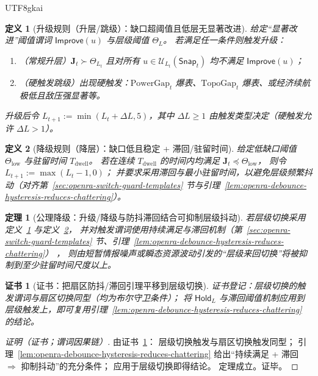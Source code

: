\documentclass[12pt]{article}
\newtheorem{definition}{定义}[section]
\newtheorem{theorem}{定理}[section]
\newtheorem{Certificate}{证书}[section]
\begin{document}
\begin{CJK*}{UTF8}{gkai}
\begin{definition}[升级规则（升层/跳级）：缺口超阈值且低层无显著改进]
\label{def:openra-level-upgrade-rule}
给定“显著改进”阈值谓词 $\mathsf{Improve}(u)$ 与层级阈值 $\Theta_L$。
若满足任一条件则触发升级：
\begin{enumerate}
  \item （常规升层）$\mathbf{J}_t \succ \Theta_{L_t}$ 且对所有 $u\in\mathcal{U}_{L_t}(\mathsf{Snap}_t)$ 均不满足 $\mathsf{Improve}(u)$；

  \item （硬触发跳级）出现硬触发：$\mathrm{PowerGap}_t$ 爆表、$\mathrm{TopoGap}_t$ 爆表、或经济续航极低且敌压强显著等。
\end{enumerate}
升级后令 $L_{t+1}:=\min(L_t+\Delta L,5)$，其中 $\Delta L\ge 1$ 由触发类型决定（硬触发允许 $\Delta L>1$）。
\end{definition}

\begin{definition}[降级规则（降层）：缺口低且稳定 + 滞回/驻留时间]
\label{def:openra-level-downgrade-rule}
给定低缺口阈值 $\Theta_{\mathrm{low}}$ 与驻留时间 $T_{\mathrm{dwell}}$。
若在连续 $T_{\mathrm{dwell}}$ 的时间内均满足 $\mathbf{J}_t \preceq \Theta_{\mathrm{low}}$，
则令 $L_{t+1}:=\max(L_t-1,0)$；
并要求采用滞回与最小驻留时间，以避免层级频繁抖动（对齐第~\ref{sec:openra-switch-guard-templates} 节与引理~\ref{lem:openra-debounce-hysteresis-reduces-chattering}）。
\end{definition}

\begin{theorem}[公理降级：升级/降级与防抖滞回结合可抑制层级抖动]
\label{thm:openra-level-switch-stability}
若层级切换采用定义~\ref{def:openra-level-upgrade-rule} 与定义~\ref{def:openra-level-downgrade-rule}，
并对触发谓词使用持续满足与滞回机制（第~\ref{sec:openra-switch-guard-templates} 节、引理~\ref{lem:openra-debounce-hysteresis-reduces-chattering}）
  ，
则由短暂情报噪声或瞬态资源波动引发的“层级来回切换”将被抑制到至少驻留时间尺度以上。
\end{theorem}

\begin{Certificate}[证书：把扇区防抖/滞回引理平移到层级切换]
\label{cert:openra-level-switch-stability}
证书登记：层级切换的触发谓词与扇区切换同型（均为布尔守卫条件）；
将 $\mathsf{Hold}_L$ 与滞回阈值机制应用到层级触发上，即可复用引理~\ref{lem:openra-debounce-hysteresis-reduces-chattering} 的结论。
\end{Certificate}

\begin{proof}[证明（证书；谓词因果链）]
由证书~\ref{cert:openra-level-switch-stability}：
层级切换触发与扇区切换触发同型；
引理~\ref{lem:openra-debounce-hysteresis-reduces-chattering} 给出“持续满足 + 滞回 $\Rightarrow$ 抑制抖动”的充分条件；
应用于层级切换即得结论。
定理成立。证毕。
\end{proof}


\end{CJK*}
\end{document}
